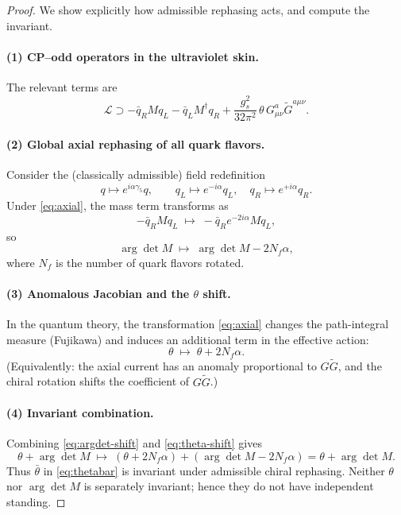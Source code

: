 \documentclass[11pt]{article}
\theoremstyle{remark}
\begin{document}
\begin{proof}
We show explicitly how admissible rephasing acts, and compute the invariant.

\paragraph{(1) CP--odd operators in the ultraviolet skin.}
The relevant terms are
\begin{equation}\label{eq:qcd-cpodd}
\mathcal{L}\supset
-\bar q_R M q_L -\bar q_L M^\dagger q_R
+ \frac{g_s^2}{32\pi^2}\,\theta\,G^a_{\mu\nu}\tilde G^{a\mu\nu}.
\end{equation}

\paragraph{(2) Global axial rephasing of all quark flavors.}
Consider the (classically admissible) field redefinition
\begin{equation}\label{eq:axial}
q\mapsto e^{i\alpha\gamma_5}q,
\qquad
q_L\mapsto e^{-i\alpha}q_L,\quad q_R\mapsto e^{+i\alpha}q_R.
\end{equation}
Under \eqref{eq:axial}, the mass term transforms as
\begin{equation}
-\bar q_R M q_L \;\mapsto\; -\bar q_R e^{-2i\alpha} M q_L,
\end{equation}
so
\begin{equation}\label{eq:argdet-shift}
\arg\det M\;\mapsto\;\arg\det M -2N_f\alpha,
\end{equation}
where $N_f$ is the number of quark flavors rotated.

\paragraph{(3) Anomalous Jacobian and the $\theta$ shift.}
In the quantum theory, the transformation \eqref{eq:axial} changes the path-integral measure
(Fujikawa) and induces an additional term in the effective action:
\begin{equation}\label{eq:theta-shift}
\theta\;\mapsto\;\theta+2N_f\alpha.
\end{equation}
(Equivalently: the axial current has an anomaly proportional to $G\tilde G$, and the chiral rotation
shifts the coefficient of $G\tilde G$.)

\paragraph{(4) Invariant combination.}
Combining \eqref{eq:argdet-shift} and \eqref{eq:theta-shift} gives
\begin{equation}
\theta+\arg\det M\;\mapsto\;(\theta+2N_f\alpha)+(\arg\det M-2N_f\alpha)=\theta+\arg\det M.
\end{equation}
Thus $\bar\theta$ in \eqref{eq:thetabar} is invariant under admissible chiral rephasing.
Neither $\theta$ nor $\arg\det M$ is separately invariant; hence they do not have independent standing.


\end{proof}
\end{document}
